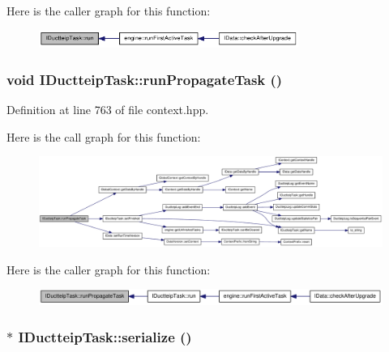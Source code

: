 Here is the caller graph for this function:\nopagebreak
\begin{figure}[H]
\begin{center}
\leavevmode
\includegraphics[width=240pt]{class_i_ductteip_task_abe3d6c79a56e71982297a88ff9a0921c_icgraph}
\end{center}
\end{figure}
\hypertarget{class_i_ductteip_task_ab388f79a34057d17d41286f57db4a288}{
\subsubsection[{runPropagateTask}]{\setlength{\rightskip}{0pt plus 5cm}void IDuctteipTask::runPropagateTask ()}}
\label{class_i_ductteip_task_ab388f79a34057d17d41286f57db4a288}


Definition at line 763 of file context.hpp.

Here is the call graph for this function:\nopagebreak
\begin{figure}[H]
\begin{center}
\leavevmode
\includegraphics[width=420pt]{class_i_ductteip_task_ab388f79a34057d17d41286f57db4a288_cgraph}
\end{center}
\end{figure}


Here is the caller graph for this function:\nopagebreak
\begin{figure}[H]
\begin{center}
\leavevmode
\includegraphics[width=340pt]{class_i_ductteip_task_ab388f79a34057d17d41286f57db4a288_icgraph}
\end{center}
\end{figure}
\hypertarget{class_i_ductteip_task_ace530f277583106811b9955fa1977f9d}{
\subsubsection[{serialize}]{ $\ast$ IDuctteipTask::serialize ()}}
\label{class_i_ductteip_task_ace530f277583106811b9955fa1977f9d}


